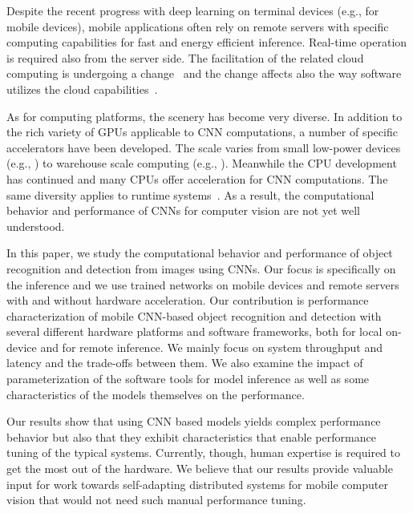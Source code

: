 \documentclass[sigconf]{acmart}
\begin{document}
Despite the recent progress with deep learning on terminal devices (e.g., \cite{lane16deepx} for mobile devices), mobile applications often rely on remote servers with specific computing capabilities for fast and energy efficient inference. Real-time operation \cite{nishihara2017realtime} is required also from the server side. The facilitation of the related cloud computing is undergoing a change~\cite{yi15mobidata} and the change affects also the way software utilizes the cloud capabilities~\cite{maas2017cloud30}.

As for computing platforms, the scenery has become very diverse. In addition to the rich variety of GPUs applicable to CNN computations, a number of specific accelerators have been developed. The scale varies from small low-power devices (e.g., \cite{snpe}) to warehouse scale computing (e.g., \cite{jouppi17tpu}). Meanwhile the CPU development~\cite{lee2010debunk} has continued and many CPUs offer acceleration for CNN computations. The same diversity applies to runtime systems~\cite{nguyen2017notanother}. As a result, the computational behavior and performance of CNNs for computer vision are not yet well understood.

In this paper, we study the computational behavior and performance of object recognition and detection from images using CNNs. Our focus is specifically on the inference and we use trained networks on mobile devices and remote servers with and without hardware acceleration. 
Our contribution is performance characterization of mobile CNN-based object recognition and detection with several different hardware platforms and software frameworks, both for local on-device and for remote inference. We mainly focus on system throughput and latency and the trade-offs between them. We also examine the impact of parameterization of the software tools for model inference as well as some characteristics of the models themselves on the performance. 

Our results show that using CNN based models yields complex performance behavior but also that they exhibit characteristics that enable performance tuning of the typical systems. Currently, though, human expertise is required to get the most out of the hardware. We believe that our results provide valuable input for work towards self-adapting distributed systems for mobile computer vision that would not need such manual performance tuning.%
\end{document}
